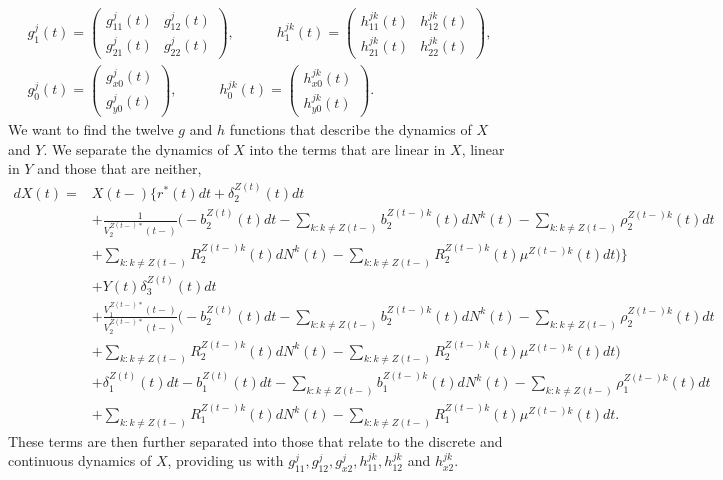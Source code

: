 \documentclass[12pt]{article}
\theoremstyle{my_thm}
\begin{document}
\begin{gather*}
g^j_1(t)=\begin{pmatrix}
g^j_{11}(t) & g^j_{12}(t) \\
g^j_{21}(t) & g^j_{22}(t)
\end{pmatrix},
\qquad 
\quad
h^{jk}_1(t)=\begin{pmatrix}
h^{jk}_{11}(t) & h^{jk}_{12}(t) \\
h^{jk}_{21}(t) & h^{jk}_{22}(t)
\end{pmatrix},
\\
g_0^j(t)=\begin{pmatrix}
g^j_{x0}(t) \\
g^j_{y0}(t)
\end{pmatrix},
\qquad 
\quad
h^{jk}_0(t)=\begin{pmatrix}
h^{jk}_{x0}(t) \\
h^{jk}_{y0}(t)
\end{pmatrix}.
\end{gather*}
We want to find the twelve $g$ and $h$ functions that describe the dynamics of $X$ and $Y$. We separate the dynamics of $X$ into the terms that are linear in $X$, linear in $Y$ and those that are neither,
\begin{align*}
dX(t)=&X(t-) \bigg\lbrace 
r^*(t)dt+\delta_2^{Z(t)}(t)dt
\\
&+
\frac{1}{V^{Z(t-)*}_2(t-)}
\bigg(
-b_2^{Z(t)}(t)dt-\sum_{k:k\neq Z(t-)}b_2^{Z(t-)k}(t)dN^k(t)
-\sum_{k:k\neq Z(t-)} \rho^{Z(t-)k}_2(t) dt
\\
&+\sum_{k:k\neq Z(t-)} R^{Z(t-)k}_2(t) dN^k(t)
-\sum_{k:k\neq Z(t-)} R^{Z(t-)k}_2(t) \mu^{Z(t-)k}(t)dt
\bigg)
\bigg\rbrace
\\
&+ Y(t)  \delta_3^{Z(t)}(t)dt
\\
&+
\frac{V^{Z(t-)*}_1(t-)}{V^{Z(t-)*}_2(t-)}
\bigg( -b_2^{Z(t)}(t)dt-\sum_{k:k\neq Z(t-)}b_2^{Z(t-)k}(t)dN^k(t)
-\sum_{k:k\neq Z(t-)} \rho^{Z(t-)k}_2(t) dt
\\
&+\sum_{k:k\neq Z(t-)} R^{Z(t-)k}_2(t) dN^k(t)
-\sum_{k:k\neq Z(t-)} R^{Z(t-)k}_2(t) \mu^{Z(t-)k}(t)dt \bigg)
\\
&+ \delta_1^{Z(t)}(t)dt 
-b_1^{Z(t)}(t)dt-\sum_{k:k\neq Z(t-)}b_1^{Z(t-)k}(t)dN^k(t)
-\sum_{k:k\neq Z(t-)} \rho^{Z(t-)k}_1(t) dt
\\
&+\sum_{k:k\neq Z(t-)} R^{Z(t-)k}_1(t) dN^k(t)
-\sum_{k:k\neq Z(t-)} R^{Z(t-)k}_1(t) \mu^{Z(t-)k}(t)dt.
\end{align*}
These terms are then further separated into those that relate to the discrete and continuous dynamics of $X$, providing us with $g_{11}^j,g_{12}^j,g_{x2}^j,h_{11}^{jk},h_{12}^{jk}$ and $h_{x2}^{jk}$.
\end{document}
